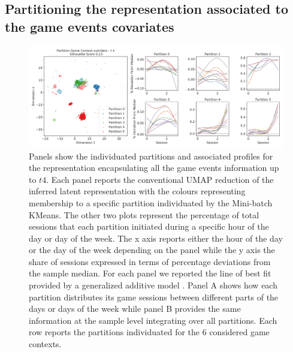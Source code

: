 \subsection{Partitioning the representation associated to the game events covariates}
\begin{figure}[ht]
\includegraphics[width=\textwidth]{images/chapter_4/clust_even.png}
\centering
\caption[Partitions of the representations generated by the RNN architectures from the game events metrics]{Panels show the individuated partitions and associated profiles for the representation encapsulating all the game events information up to $t4$. Each panel reports the conventional UMAP reduction of the inferred latent representation with the colours representing membership to a specific partition individuated by the Mini-batch KMeans. The other two plots represent the percentage of total sessions that each partition initiated during a specific hour of the day or day of the week. The x axis reports either the hour of the day or the day of the week depending on the panel while the y axis the share of sessions expressed in terms of percentage deviations from the sample median. For each panel we reported the line of best fit provided by a generalized additive model \cite{serven2018}. Panel A shows how each partition distributes its game sessions between different parts of the days or days of the week while panel B provides the same information at the sample level integrating over all partitions. Each row reports the partitions individuated for the 6 considered game contexts.}
\label{partition_rnn_even} 
\end{figure}

